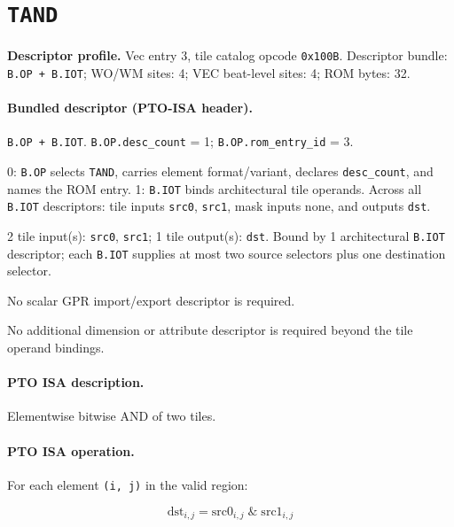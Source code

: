 \section{\texttt{TAND}}
\noindent\textbf{Descriptor profile.} Vec entry 3, tile catalog opcode \texttt{0x100B}. Descriptor bundle: \texttt{B.OP + B.IOT}; WO/WM sites: 4; VEC beat-level sites: 4; ROM bytes: 32.\par\smallskip
{}
\paragraph{Bundled descriptor (PTO-ISA header).}
\begin{description}[leftmargin=0.18\linewidth,style=nextline]
\item[Bundle] \texttt{B.OP + B.IOT}. \texttt{B.OP.desc\_count} = 1; \texttt{B.OP.rom\_entry\_id} = 3.
\item[Assembly] 0: \texttt{B.OP} selects \texttt{TAND}, carries element format/variant, declares \texttt{desc\_count}, and names the ROM entry. 1: \texttt{B.IOT} binds architectural tile operands. Across all \texttt{B.IOT} descriptors: tile inputs \texttt{src0}, \texttt{src1}, mask inputs none, and outputs \texttt{dst}.
\item[Tile operands] 2 tile input(s): \texttt{src0}, \texttt{src1}; 1 tile output(s): \texttt{dst}. Bound by 1 architectural \texttt{B.IOT} descriptor; each \texttt{B.IOT} supplies at most two source selectors plus one destination selector.
\item[Scalar GPR operands] No scalar GPR import/export descriptor is required.
\item[Metadata operands] No additional dimension or attribute descriptor is required beyond the tile operand bindings.
\end{description}
\par\smallskip
{\small
\paragraph{PTO ISA description.}
Elementwise bitwise AND of two tiles.
\paragraph{PTO ISA operation.}
For each element \texttt{(i, j)} in the valid region:

\[
\mathrm{dst}_{i,j} = \mathrm{src0}_{i,j} \;\&\; \mathrm{src1}_{i,j}
\]
}\par\smallskip
